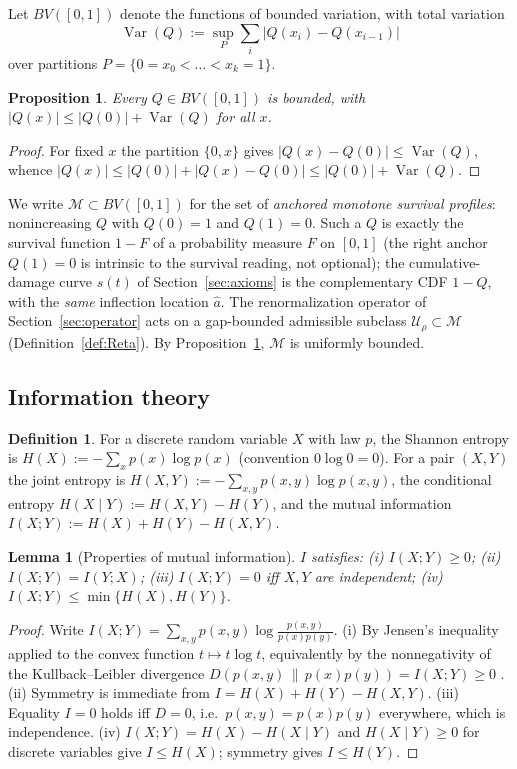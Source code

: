 \documentclass[11pt]{article}
\theoremstyle{plain}
\newtheorem{lemma}[theorem]{Lemma}
\newtheorem{proposition}[theorem]{Proposition}
\theoremstyle{definition}
\newtheorem{definition}[theorem]{Definition}
\theoremstyle{remark}
\DeclareMathOperator{\Var}{Var}
\newcommand{\abs}[1]{\left\lvert#1\right\rvert}
\begin{document}
Let $BV([0,1])$ denote the functions of bounded variation, with total variation
\[
\Var(Q):=\sup_{P}\sum_{i}\abs{Q(x_i)-Q(x_{i-1})}
\]
over partitions $P=\{0=x_0<\dots<x_k=1\}$.

\begin{proposition}\label{prop:bv}
Every $Q\in BV([0,1])$ is bounded, with $\abs{Q(x)}\le\abs{Q(0)}+\Var(Q)$ for all $x$.
\end{proposition}
\begin{proof}
For fixed $x$ the partition $\{0,x\}$ gives $\abs{Q(x)-Q(0)}\le\Var(Q)$, whence $\abs{Q(x)}\le\abs{Q(0)}+\abs{Q(x)-Q(0)}\le\abs{Q(0)}+\Var(Q)$.
\end{proof}

We write $\mathcal{M}\subset BV([0,1])$ for the set of \emph{anchored monotone survival profiles}: nonincreasing $Q$ with $Q(0)=1$ and $Q(1)=0$. Such a $Q$ is exactly the survival function $1-F$ of a probability measure $F$ on $[0,1]$ (the right anchor $Q(1)=0$ is intrinsic to the survival reading, not optional); the cumulative-damage curve $s(t)$ of Section~\ref{sec:axioms} is the complementary CDF $1-Q$, with the \emph{same} inflection location $\hat a$. The renormalization operator of Section~\ref{sec:operator} acts on a gap-bounded admissible subclass $\mathcal U_\rho\subset\mathcal M$ (Definition~\ref{def:Reta}). By Proposition~\ref{prop:bv}, $\mathcal{M}$ is uniformly bounded.

\subsection{Information theory}

\begin{definition}
For a discrete random variable $X$ with law $p$, the Shannon entropy is $H(X):=-\sum_x p(x)\log p(x)$ (convention $0\log 0=0$). For a pair $(X,Y)$ the joint entropy is $H(X,Y):=-\sum_{x,y}p(x,y)\log p(x,y)$, the conditional entropy $H(X\mid Y):=H(X,Y)-H(Y)$, and the mutual information $I(X;Y):=H(X)+H(Y)-H(X,Y)$.
\end{definition}

\begin{lemma}[Properties of mutual information]\label{lem:mi}
$I$ satisfies: (i) $I(X;Y)\ge 0$; (ii) $I(X;Y)=I(Y;X)$; (iii) $I(X;Y)=0$ iff $X,Y$ are independent; (iv) $I(X;Y)\le\min\{H(X),H(Y)\}$.
\end{lemma}
\begin{proof}
Write $I(X;Y)=\sum_{x,y}p(x,y)\log\frac{p(x,y)}{p(x)p(y)}$. (i) By Jensen's inequality applied to the convex function $t\mapsto t\log t$, equivalently by the nonnegativity of the Kullback--Leibler divergence $D\!\left(p(x,y)\,\|\,p(x)p(y)\right)=I(X;Y)\ge 0$ \citep{coverthomas2006}. (ii) Symmetry is immediate from $I=H(X)+H(Y)-H(X,Y)$. (iii) Equality $I=0$ holds iff $D=0$, i.e.\ $p(x,y)=p(x)p(y)$ everywhere, which is independence. (iv) $I(X;Y)=H(X)-H(X\mid Y)$ and $H(X\mid Y)\ge 0$ for discrete variables give $I\le H(X)$; symmetry gives $I\le H(Y)$.
\end{proof}
\end{document}
